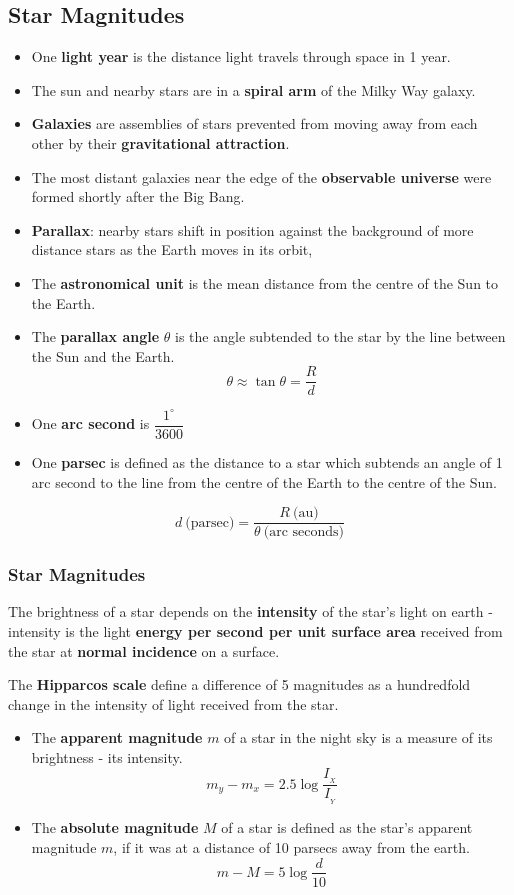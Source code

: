 \subsection{Star Magnitudes}

\begin{itemize}
    \item One \textbf{light year} is the distance light travels through space in 1 year.
    \item The sun and nearby stars are in a \textbf{spiral arm} of the Milky Way galaxy.
    \item \textbf{Galaxies} are assemblies of stars prevented from moving away from each other by their \textbf{gravitational attraction}.
    \item The most distant galaxies near the edge of the \textbf{observable universe} were formed shortly after the Big Bang.
    \item \textbf{Parallax}: nearby stars shift in position against the background of more distance stars as the Earth moves in its orbit,
    \item The \textbf{astronomical unit} is the mean distance from the centre of the Sun to the Earth.
    \item The \textbf{parallax angle} $\theta$ is the angle subtended to the star by the line between the Sun and the Earth.
        $$\theta\approx\tan\theta=\frac{R}{d}$$
    \item One \textbf{arc second} is $\dfrac{1^\circ}{3600}$
    \item One \textbf{parsec} is defined as the distance to a star which subtends an angle of 1 arc second to the line from the centre of the Earth to the centre of the Sun.
\end{itemize}
$$d\ \text{(parsec)}=\frac{R\ \text{(au)}}{\theta\ \text{(arc seconds)}}$$

\subsubsection*{Star Magnitudes}

The brightness of a star depends on the \textbf{intensity} of the star's light on earth - intensity is the light \textbf{energy per second per unit surface area} received from the star at \textbf{normal incidence} on a surface.

The \textbf{Hipparcos scale} define a difference of 5 magnitudes as a hundredfold change in the intensity of light received from the star.
\begin{itemize}
    \item The \textbf{apparent magnitude} $m$ of a star in the night sky is a measure of its brightness - its intensity.
        $$m_y-m_x=2.5\log\frac{I_{_X}}{I_{_Y}}$$
    \item The \textbf{absolute magnitude} $M$ of a star is defined as the star's apparent magnitude $m$, if it was at a distance of 10 parsecs away from the earth.
        $$m-M=5\log\frac{d}{10}$$
\end{itemize}
